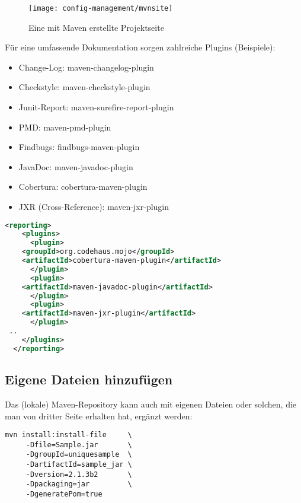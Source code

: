 \newslide
\begin{figure}[H]
\centering
\texttt{[image: config-management/mvnsite]}
\caption{Eine mit Maven erstellte Projektseite}
\end{figure}
\newslide
Für eine umfassende Dokumentation sorgen zahlreiche Plugins (Beispiele):
\begin{itemize}
\item Change-Log: maven-changelog-plugin
\item Checkstyle: maven-checkstyle-plugin
\item Junit-Report: maven-surefire-report-plugin
\item PMD: maven-pmd-plugin
\item Findbugs: findbugs-maven-plugin
\item JavaDoc: maven-javadoc-plugin
\item Cobertura: cobertura-maven-plugin
\item JXR (Cross-Reference): maven-jxr-plugin
\end{itemize}
\newslide
\begin{lstlisting}[language=xml,
  morekeywords={reporting,plugins,plugin,groupId,artifactId,
    version,configuration}]
  <reporting>
    <plugins>
      <plugin>
	<groupId>org.codehaus.mojo</groupId>
	<artifactId>cobertura-maven-plugin</artifactId>
      </plugin>
      <plugin>
	<artifactId>maven-javadoc-plugin</artifactId>
      </plugin>
      <plugin>
	<artifactId>maven-jxr-plugin</artifactId>
      </plugin>
 ..
    </plugins>
  </reporting>
\end{lstlisting}
\newslide
\newslide
\subsection{Eigene Dateien hinzufügen}
Das (lokale) Maven-Repository kann auch mit eigenen Dateien oder solchen,
die man von dritter Seite erhalten hat, ergänzt werden:
\begin{lstlisting}
mvn install:install-file     \
     -Dfile=Sample.jar       \
     -DgroupId=uniquesample  \
     -DartifactId=sample_jar \
     -Dversion=2.1.3b2       \
     -Dpackaging=jar         \
     -DgeneratePom=true
\end{lstlisting}
%
\newslide
